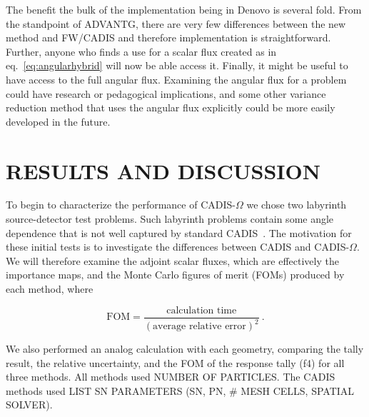 \documentclass[12pt]{article}
\begin{document}
The benefit the bulk of the implementation being in Denovo is several fold. 
From the standpoint of ADVANTG, there are very few differences between the new method and FW/CADIS and therefore implementation is straightforward.
Further, anyone who finds a use for a scalar flux created as in eq.~\eqref{eq:angularhybrid} will now be able  access it.
Finally, it might be useful to have access to the full angular flux. 
Examining the angular flux for a problem could have research or pedagogical implications, and some other variance reduction method that uses the angular flux explicitly could be more easily developed in the future.

%
\section{RESULTS AND DISCUSSION} 
\label{sect::results}

To begin to characterize the performance of CADIS-$\Omega$ we chose two labyrinth source-detector test problems.
Such labyrinth problems contain some angle dependence that is not well captured by standard CADIS~\cite{Peplow-ORNL}. 
The motivation for these initial tests is to investigate the differences between CADIS and CADIS-$\Omega$.
We will therefore examine the adjoint scalar fluxes, which are effectively the importance maps, and the Monte Carlo figures of merit (FOMs) produced by each method, where 

\[\text{FOM} = \frac{\text{calculation time}}{(\text{average relative error})^2}\:. \]


We also performed an analog calculation with each geometry, comparing  the tally result, the relative uncertainty, and the FOM of the response tally (f4) for all three methods.
All methods used NUMBER OF PARTICLES. 
The CADIS methods used LIST SN PARAMETERS (SN, PN, \# MESH CELLS, SPATIAL SOLVER).
\end{document}
